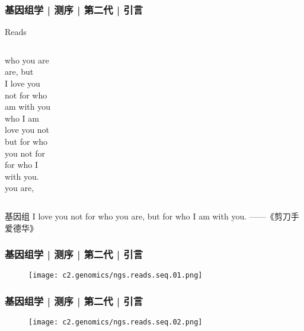 \begin{frame}
  \frametitle{基因组学 | 测序 | 第二代 | 引言}
  \begin{block}{Reads}
    \begin{columns}
      who you are \\ are, but \\ I love you \\ not for who \\ am with you \\ who I am \\
      love you not \\ but for who \\ you not for \\ for who I \\ with you. \\ you are, \\
    \end{columns}
  \end{block}
  \pause
  \pause
  \pause
  \pause
  \begin{block}{基因组}
    I love you not for who you are, but for who I am with you. ——《剪刀手爱德华》
  \end{block}
\end{frame}

\begin{frame}
  \frametitle{基因组学 | 测序 | 第二代 | 引言}
  \begin{figure}
    \centering
    \texttt{[image: c2.genomics/ngs.reads.seq.01.png]}
  \end{figure}
\end{frame}

\begin{frame}
  \frametitle{基因组学 | 测序 | 第二代 | 引言}
  \begin{figure}
    \centering
    \texttt{[image: c2.genomics/ngs.reads.seq.02.png]}
  \end{figure}
\end{frame}

